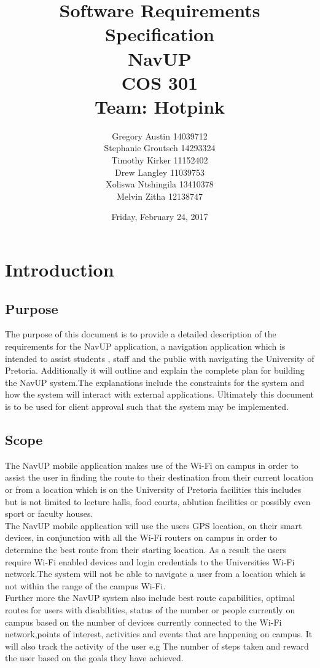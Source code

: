 \documentclass[11pt,a4paper]{report}
\title{Software Requirements Specification \\ NavUP \\ COS 301 \\ Team: Hotpink}
\date{Friday, February 24, 2017}
\author{Gregory Austin 14039712 \\ Stephanie Groutsch 14293324 \\ Timothy Kirker 11152402 \\ Drew Langley 11039753 \\ Xoliswa Ntshingila 13410378
\\ Melvin Zitha 12138747}
\begin{document}
\maketitle
\newpage
\tableofcontents

\newpage
\chapter{Introduction}
	\section{Purpose}
	The purpose of this document is to provide a detailed description of the requirements for the NavUP application, a navigation application which is intended to assist students , staff and the  public with navigating the University of Pretoria. Additionally it will outline and explain the complete plan for building the NavUP system.The explanations include the constraints for the system and how the system will interact with external applications. Ultimately this document is to be used for client approval such that the system may be implemented.

	\section{Scope}

		The NavUP mobile application makes use of the Wi-Fi on campus in order to assist the user in finding the route to their destination from their current location or from a location which is on the University of Pretoria facilities this includes but is not limited to lecture halls, food courts, ablution facilities or possibly even sport or faculty houses. 
		\\
		The NavUP mobile application will use the users GPS location, on their smart devices, in conjunction with all the Wi-Fi routers on campus in order to determine the best route from their starting location. As a result the users require Wi-Fi enabled devices and login credentials to the Universities Wi-Fi network.The system will not be able to navigate a user from a location which is 			not within the range of the campus Wi-Fi.
		\\
 		Further more the  NavUP system also include best route capabilities, optimal routes for users with disabilities, status of the number or people currently on campus based on the number of devices currently connected to the Wi-Fi network,points of interest, activities and events that are happening on campus. It will also track the activity of the user e.g The number of steps 				taken and reward the user based on the goals  they have achieved.
\end{document}
